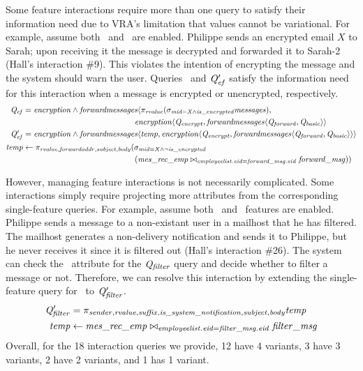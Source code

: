 %
Some feature interactions require more than one query to satisfy their
information need
 due to VRA's limitation that values cannot be variational.
For example, assume both \encryption\ and \forwardmessages\ are enabled.
Philippe sends an encrypted email $X$ to Sarah; upon receiving it the message
is decrypted and forwarded it to Sarah-2 (Hall's interaction \#9). This
violates the intention of encrypting the message and the system should warn the
user.
%
Queries \Qef\ and $\Qef'$ satisfy the information need for this interaction
when a message is encrypted or unencrypted, respectively.
%
\begin{align*}
\small
\Qef &= \encryption\wedge\forwardmessages 
  \langle
    \projectRel{\rvalue}{(\selectRel{\midCond\wedge\isencrypted}{\messages})},\\
&\qquad\qquad\qquad\qquad\qquad\qquad\qquad    \encryption\langle\Qencrypt, 
 \chc[\forwardmessages]{\Qforward,\Qbasic} \rangle \\
\OB{\Qef'} &= \encryption\wedge\forwardmessages
  \langle \temp, \encryption \langle \Qencrypt, 
  \chc[\forwardmessages]{\Qforward,\Qbasic} \rangle \rangle \\
\temp &\leftarrow
  \pi_{\rvalue,\forwardaddr,\subject,\body} (\sigma_{\midCond \wedge \neg\isencrypted} \\
  &\qquad\qquad\qquad\qquad\qquad\qquad\qquad  (\mretable \bowtie_{\employees.\eid = \forwardmsg.\eid} \forwardmsg))
\end{align*}

\noindent
%
However, managing feature interactions is not necessarily complicated. Some
interactions simply require projecting more attributes from the corresponding
single-feature queries. For example, assume both \filtermessages\ and
\mailhost\ features are enabled. Philippe sends a message to a non-existant
user in a mailhost that he has filtered. The mailhost generates a non-delivery
notification and sends it to Philippe, but he never receives it since it is filtered out
(Hall's interaction \#26). The system can check the \issystemnotification\
attribute for the $\Qfilter$ query and decide whether to filter a message or
not. Therefore, we can resolve this interaction by extending the single-feature
query for \filtermessages\ to $\Qfilter'$.
%
\begin{align*}
\small
\OB{\Qfilter'} &= 
\projectRel {\sender, \rvalue, \suffix, \issystemnotification, \subject, \body} \temp\\
\temp &\leftarrow 
{\joinRel \mretable
\filtermsg
{\employees . \eid = \filtermsg . \eid }
}
\end{align*}
\noindent
%
Overall, for the 18 interaction queries we provide, 12 have 4 variants, 3 have
3 variants, 2 have 2 variants, and 1 has 1 variant.

